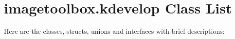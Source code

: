 \section{imagetoolbox.kdevelop Class List}
Here are the classes, structs, unions and interfaces with brief descriptions:\begin{CompactList}
\item{}
\end{CompactList}
